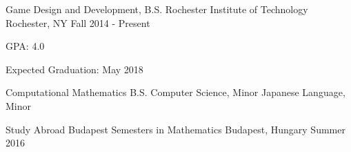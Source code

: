 


\begin{cventries}


\eduentry
{Game Design and Development, B.S.} %
{Rochester Institute of Technology} %
{Rochester, NY} %
{Fall 2014 - Present} %
{
\begin{cvitems}
\item GPA: 4.0
\item Expected Graduation: May 2018
\end{cvitems}
}
{Computational Mathematics B.S.}
{Computer Science, Minor}
{Japanese Language, Minor}

\cventry
{Study Abroad} %
{Budapest Semesters in Mathematics} %
{Budapest, Hungary} %
{Summer 2016} %
{}



\end{cventries}
